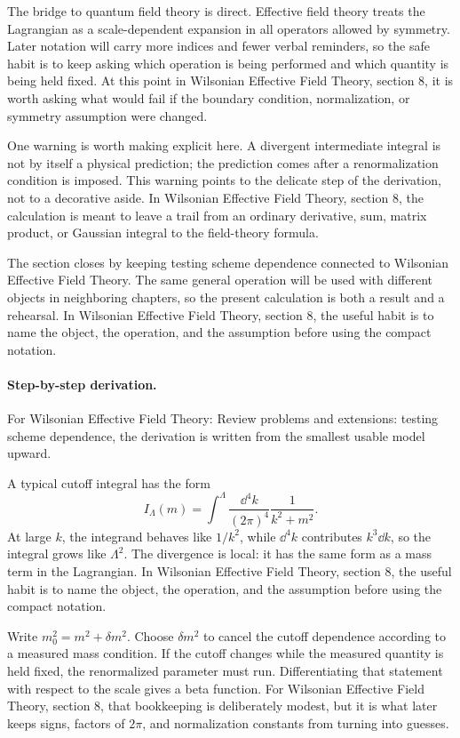 The bridge to quantum field theory is direct.  Effective field theory treats the Lagrangian as a scale-dependent expansion in all operators allowed by symmetry.  Later notation will carry more indices and fewer verbal reminders, so the safe habit is to keep asking which operation is being performed and which quantity is being held fixed.  At this point in Wilsonian Effective Field Theory, section 8, it is worth asking what would fail if the boundary condition, normalization, or symmetry assumption were changed.

One warning is worth making explicit here.  A divergent intermediate integral is not by itself a physical prediction; the prediction comes after a renormalization condition is imposed.  This warning points to the delicate step of the derivation, not to a decorative aside.  In Wilsonian Effective Field Theory, section 8, the calculation is meant to leave a trail from an ordinary derivative, sum, matrix product, or Gaussian integral to the field-theory formula.

The section closes by keeping testing scheme dependence connected to Wilsonian Effective Field Theory.  The same general operation will be used with different objects in neighboring chapters, so the present calculation is both a result and a rehearsal.  In Wilsonian Effective Field Theory, section 8, the useful habit is to name the object, the operation, and the assumption before using the compact notation.



\paragraph{Step-by-step derivation.}

For Wilsonian Effective Field Theory: Review problems and extensions: testing scheme dependence, the derivation is written from the smallest usable model upward.

A typical cutoff integral has the form
\[
  I_\Lambda(m)=\int^{\Lambda}\frac{\dd^4k}{(2\pi)^4}\frac{1}{k^2+m^2}.
\]
At large \(k\), the integrand behaves like \(1/k^2\), while \(\dd^4k\) contributes \(k^3\dd k\), so the integral grows like \(\Lambda^2\).  The divergence is local: it has the same form as a mass term in the Lagrangian.  In Wilsonian Effective Field Theory, section 8, the useful habit is to name the object, the operation, and the assumption before using the compact notation.

Write \(m_0^2=m^2+\delta m^2\).  Choose \(\delta m^2\) to cancel the cutoff dependence according to a measured mass condition.  If the cutoff changes while the measured quantity is held fixed, the renormalized parameter must run.  Differentiating that statement with respect to the scale gives a beta function.  For Wilsonian Effective Field Theory, section 8, that bookkeeping is deliberately modest, but it is what later keeps signs, factors of \(2\pi\), and normalization constants from turning into guesses.

